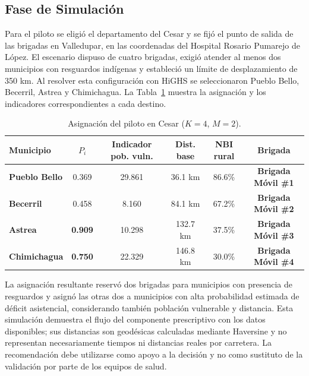 \documentclass[12pt]{article}
\begin{document}
\subsection{Fase de Simulación}
Para el piloto se eligió el departamento del Cesar y se fijó el punto de salida de las brigadas en Valledupar, en las coordenadas del Hospital Rosario Pumarejo de López. El escenario dispuso de cuatro brigadas, exigió atender al menos dos municipios con resguardos indígenas y estableció un límite de desplazamiento de 350 km. Al resolver esta configuración con HiGHS se seleccionaron Pueblo Bello, Becerril, Astrea y Chimichagua. La Tabla~\ref{tab:cesar} muestra la asignación y los indicadores correspondientes a cada destino.

\begin{table}[H]
\centering
\scriptsize
\caption{Asignación del piloto en Cesar ($K=4$, $M=2$).}
\label{tab:cesar}
\begin{tabular}{@{}lccccc@{}}
\toprule
\textbf{Municipio} & $P_i$ & \textbf{Indicador pob. vuln.} & \textbf{Dist. base} & \textbf{NBI rural} & \textbf{Brigada} \\
\midrule
\textbf{Pueblo Bello} & 0.369 & 29.861 & 36.1 km & 86.6\% & \textbf{Brigada Móvil \#1} \\
\textbf{Becerril} & 0.458 & 8.160 & 84.1 km & 67.2\% & \textbf{Brigada Móvil \#2} \\
\textbf{Astrea} & \textbf{0.909} & 10.298 & 132.7 km & 37.5\% & \textbf{Brigada Móvil \#3} \\
\textbf{Chimichagua} & \textbf{0.750} & 22.329 & 146.8 km & 30.0\% & \textbf{Brigada Móvil \#4} \\
\bottomrule
\end{tabular}
\end{table}

La asignación resultante reservó dos brigadas para municipios con presencia de resguardos y asignó las otras dos a municipios con alta probabilidad estimada de déficit asistencial, considerando también población vulnerable y distancia. Esta simulación demuestra el flujo del componente prescriptivo con los datos disponibles; sus distancias son geodésicas calculadas mediante Haversine y no representan necesariamente tiempos ni distancias reales por carretera. La recomendación debe utilizarse como apoyo a la decisión y no como sustituto de la validación por parte de los equipos de salud.
\end{document}

